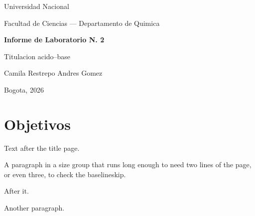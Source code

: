 \documentclass[12pt]{article}
\begin{document}
\begin{titlepage}
\centering
{\Large Universidad Nacional\par}
\vspace{1cm}
{\large Facultad de Ciencias --- Departamento de Quimica\par}
\vspace{3cm}
{\huge\bfseries Informe de Laboratorio N. 2\par}
\vspace{0.5cm}
{\Large Titulacion acido--base\par}
\vspace{3cm}
{\large Camila Restrepo \quad Andres Gomez\par}
\vfill
{\large Bogota, 2026\par}
\end{titlepage}

\section{Objetivos}
Text after the title page.

{\large A paragraph in a size group that runs long enough to need two lines of the page, or even three, to check the baselineskip.\par}
After it.
\bigskip

Another \bigskip paragraph.
\end{document}
